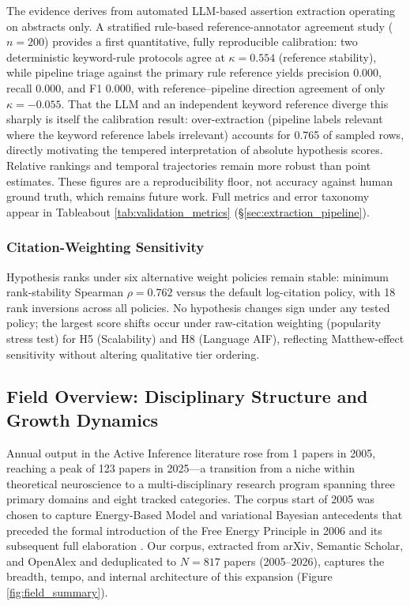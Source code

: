 \documentclass[
  english,
]{article}
\begin{document}
The evidence derives from automated LLM-based assertion extraction
operating on abstracts only. A stratified rule-based reference-annotator
agreement study (\(n = 200\)) provides a first quantitative, fully
reproducible calibration: two deterministic keyword-rule protocols agree
at \(\kappa = 0.554\) (reference stability), while pipeline triage
against the primary rule reference yields precision 0.000, recall 0.000,
and F1 0.000, with reference--pipeline direction agreement of only
\(\kappa = -0.055\). That the LLM and an independent keyword reference
diverge this sharply is itself the calibration result: over-extraction
(pipeline labels relevant where the keyword reference labels irrelevant)
accounts for 0.765 of sampled rows, directly motivating the tempered
interpretation of absolute hypothesis scores. Relative rankings and
temporal trajectories remain more robust than point estimates. These
figures are a reproducibility floor, not accuracy against human ground
truth, which remains future work. Full metrics and error taxonomy appear
in Tableabout \ref{tab:validation_metrics}
(\S\ref{sec:extraction_pipeline}).

\subsubsection{Citation-Weighting
Sensitivity}\label{citation-weighting-sensitivity}

Hypothesis ranks under six alternative weight policies remain stable:
minimum rank-stability Spearman \(\rho = 0.762\) versus the default
log-citation policy, with 18 rank inversions across all policies. No
hypothesis changes sign under any tested policy; the largest score
shifts occur under raw-citation weighting (popularity stress test) for
H5 (Scalability) and H8 (Language AIF), reflecting Matthew-effect
sensitivity without altering qualitative tier ordering.

\newpage

\subsection{\texorpdfstring{Field Overview: Disciplinary Structure and
Growth Dynamics
\label{sec:field_overview}}{Field Overview: Disciplinary Structure and Growth Dynamics}}\label{field-overview-disciplinary-structure-and-growth-dynamics}

Annual output in the Active Inference literature rose from 1 papers in
2005, reaching a peak of 123 papers in 2025---a transition from a niche
within theoretical neuroscience to a multi-disciplinary research program
spanning three primary domains and eight tracked categories. The corpus
start of 2005 was chosen to capture Energy-Based Model and variational
Bayesian antecedents \citep{dayan1995helmholtz, lecun2006tutorial} that
preceded the formal introduction of the Free Energy Principle in 2006
\citep{friston2006free} and its subsequent full elaboration
\citep{friston2010free}. Our corpus, extracted from arXiv, Semantic
Scholar, and OpenAlex and deduplicated to \(N = 817\) papers
(2005--2026), captures the breadth, tempo, and internal architecture of
this expansion (Figure \ref{fig:field_summary}).
\end{document}
